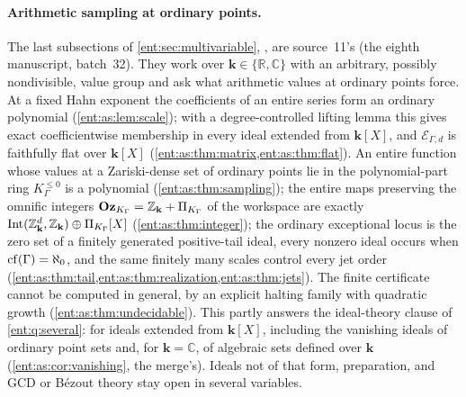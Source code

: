 \documentclass[11pt]{article}
\theoremstyle{plain}
\theoremstyle{plain}
\theoremstyle{plain}
\theoremstyle{definition}
\theoremstyle{definition}
\theoremstyle{definition}
\theoremstyle{definition}
\theoremstyle{remark}
\newcommand{\C}{\mathbb C}\newcommand{\R}{\mathbb R}
\newcommand{\K}{K_\Gamma}\newcommand{\KD}{K_\Delta}
\newcommand{\kk}{\mathbf k}\newcommand{\PP}{\mathbb P}
\newcommand{\Oz}{\mathbf{Oz}}\newcommand{\Ed}{\mathcal E_{\Gamma,d}}
\newcommand{\Kle}{K_\Gamma^{\le0}}\DeclareMathOperator{\Jac}{Jac}
\newcommand{\Zk}{\Z_{\kk}}\newcommand{\OzK}{\Oz_{\K}}
\newcommand{\PiK}{\Pi_{\K}}\newcommand{\pg}{\mathsf p}
\DeclareMathOperator{\Int}{Int}\DeclareMathOperator{\ct}{ct}
\begin{document}
\paragraph{Arithmetic sampling at ordinary points.}
The last subsections of \cref{ent:sec:multivariable},
, are source~11's (the
eighth manuscript, batch~32). They work over $\kk\in\{\R,\C\}$ with an
arbitrary, possibly nondivisible, value group and ask what arithmetic values
at ordinary points force. At a fixed Hahn exponent the coefficients of an
entire series form an ordinary polynomial (\cref{ent:as:lem:scale}); with a
degree-controlled lifting lemma this gives exact coefficientwise membership in
every ideal extended from $\kk[X]$, and $\Ed$ is faithfully flat over $\kk[X]$
(\cref{ent:as:thm:matrix,ent:as:thm:flat}). An entire function whose values
at a Zariski-dense set of ordinary points lie in the polynomial-part ring
$\Kle$ is a polynomial (\cref{ent:as:thm:sampling}); the entire maps preserving
the omnific integers $\OzK=\Zk+\PiK$ of the workspace are exactly
$\Int(\Zk^d,\Zk)\oplus\PiK[X]$ (\cref{ent:as:thm:integer}); the ordinary
exceptional locus is the zero set of a finitely generated positive-tail ideal,
every nonzero ideal occurs when $\operatorname{cf}(\Gamma)=\aleph_0$, and the same finitely
many scales control every jet order
(\cref{ent:as:thm:tail,ent:as:thm:realization,ent:as:thm:jets}). The finite
certificate cannot be computed in general, by an explicit halting family with
quadratic growth (\cref{ent:as:thm:undecidable}). This partly answers the
ideal-theory clause of \cref{ent:q:several}: for ideals extended from
$\kk[X]$, including the vanishing ideals of ordinary point sets and, for
$\kk=\C$, of algebraic sets defined over $\kk$ (\cref{ent:as:cor:vanishing},
the merge's). Ideals not of that form, preparation, and GCD or B\'ezout theory
stay open in several variables.
\end{document}
